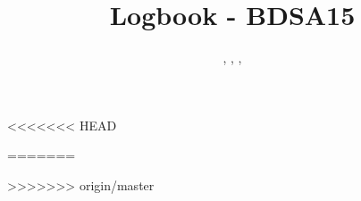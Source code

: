 \documentclass[]{article}
\title{Logbook - BDSA15}
\author{\dttn, \wmar, \jmmo,\\
	 \tvao}
\begin{document}
\maketitle
\newpage
\tableofcontents
\newpage







<<<<<<< HEAD

=======


>>>>>>> origin/master
\end{document}
